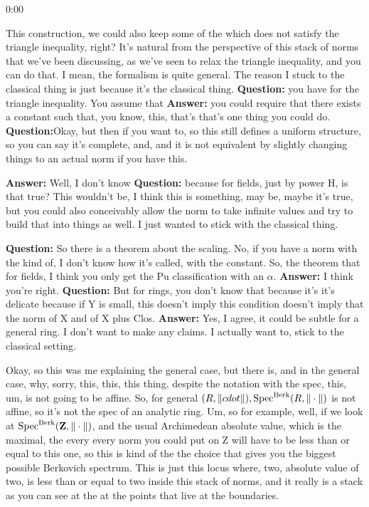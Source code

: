 \begin{unfinished}{0:00}

This construction, we could also keep some of the which does not satisfy the triangle inequality, right? 
It's natural from the perspective of this stack of norms that we've been discussing, as we've seen to relax the triangle inequality, and you can do that. I mean, the formalism is quite general.
The reason I stuck to the classical thing is just because it's the classical thing.
\textbf{Question:} you have for the triangle inequality. You assume that 
\textbf{Answer:}  you could require that there exists a constant such that, you know, this, that's that's one thing you could do. 
\textbf{Question:}Okay, but then if you want to, so this still defines a uniform structure, so you can say it's complete, and, and it is not equivalent by slightly changing things to an actual norm if you have this. 

\textbf{Answer:} Well, I don't know 
\textbf{Question:} because for fields, just by power H, is that true? This wouldn't be, I think this is something, may be, maybe it's true, but you could also conceivably allow the norm to take infinite values and try to build that into things as well. I just wanted to stick with the classical thing.

\textbf{Question:} So there is a theorem about the scaling. No, if you have a norm with the kind of, I don't know how it's called, with the constant. So, the theorem that for fields, I think you only get the Pu classification with an $\alpha$. 
\textbf{Answer:} I think you're right. 
\textbf{Question:} But for rings, you don't know that because it's it's delicate because if Y is small, this doesn't imply this condition doesn't imply that the norm of X and of X plus Clos.
\textbf{Answer:} Yes, I agree, it could be subtle for a general ring. I don't want to make any claims. I actually want to, stick to the classical setting.

Okay, so this was me explaining the general case, but there is, and in the general case, why, sorry, this, this, this thing, despite the notation with the spec, this, um, is not going to be affine. So, for general $(R, \| cdot \|), \operatorname{Spec}^{\mathrm{Berk}} (R, \| \cdot \|)$ is not affine, so it's not the spec of an analytic ring. Um, so for example, well, if we look at $\operatorname{Spec}^{\mathrm{Berk}} (\mathbf Z, \| \cdot \|)$, and the usual Archimedean absolute value, which is the maximal, the every every norm you could put on Z will have to be less than or equal to this one, so this is kind of the the choice that gives you the biggest possible Berkovich spectrum. This is just this locus where, two, absolute value of two, is less than or equal to two inside this stack of norms, and it really is a stack as you can see at the at the points that live at the boundaries.


\end{unfinished}
